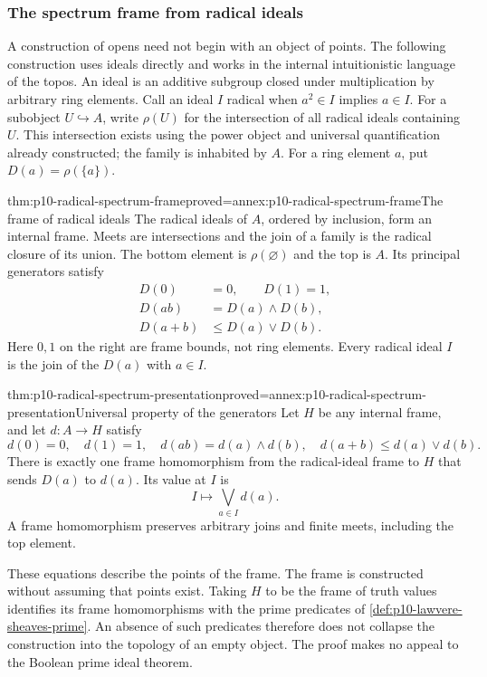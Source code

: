 \subsubsection{The spectrum frame from radical ideals}
\label{sec:p10-radical-ideal-spectrum}

A construction of opens need not begin with an object of points.
The following construction uses ideals directly and works in the
internal intuitionistic language of the topos.
An ideal is an additive subgroup closed under multiplication by
arbitrary ring elements. Call an ideal \(I\) radical when
\(a^2\in I\) implies \(a\in I\).
For a subobject \(U\hookrightarrow A\), write \(\rho(U)\) for the
intersection of all radical ideals containing \(U\).
This intersection exists using the power object and universal
quantification already constructed; the family is inhabited by \(A\).
For a ring element \(a\), put \(D(a)=\rho(\{a\})\).

\begin{hbtheorem}{thm:p10-radical-spectrum-frame}{proved=annex:p10-radical-spectrum-frame}{The frame of radical ideals}
The radical ideals of \(A\), ordered by inclusion, form an internal
frame. Meets are intersections and the join of a family is the radical
closure of its union. The bottom element is \(\rho(\varnothing)\)
and the top is \(A\).
Its principal generators satisfy
\[
 \begin{aligned}
 D(0)&=0,\qquad D(1)=1,\\
 D(ab)&=D(a)\wedge D(b),\\
 D(a+b)&\leq D(a)\vee D(b).
 \end{aligned}
\]
Here \(0,1\) on the right are frame bounds, not ring elements.
Every radical ideal \(I\) is the join of the \(D(a)\) with \(a\in I\).
\end{hbtheorem}

\begin{hbtheorem}{thm:p10-radical-spectrum-presentation}{proved=annex:p10-radical-spectrum-presentation}{Universal property of the generators}
Let \(H\) be any internal frame, and let \(d:A\to H\) satisfy
\[
 d(0)=0,\quad d(1)=1,\quad
 d(ab)=d(a)\wedge d(b),\quad
 d(a+b)\leq d(a)\vee d(b).
\]
There is exactly one frame homomorphism from the radical-ideal frame
to \(H\) that sends \(D(a)\) to \(d(a)\). Its value at \(I\) is
\[
 I\longmapsto\bigvee_{a\in I}d(a).
\]
A frame homomorphism preserves arbitrary joins and finite meets,
including the top element.
\end{hbtheorem}

These equations describe the points of the frame.
The frame is constructed without assuming that points exist.
Taking \(H\) to be the frame of truth values identifies its
frame homomorphisms with the prime predicates of
\cref{def:p10-lawvere-sheaves-prime}.
An absence of such predicates therefore does not collapse the
construction into the topology of an empty object.
The proof makes no appeal to the Boolean prime ideal theorem.

